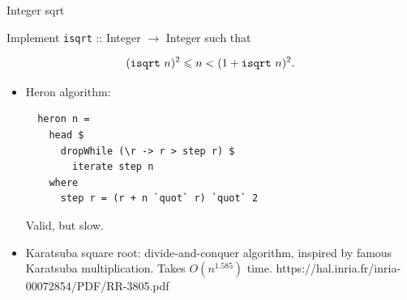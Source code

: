 \documentclass[handout]{beamer}
\def\le{\leqslant}
\def\isqrt#1{{\tt isqrt}~#1}
\begin{document}
\begin{frame}[fragile]{Integer sqrt}

Implement {\tt isqrt} :: Integer $\to$ Integer such that

$$(\isqrt n)^2 \le n < (1 + \isqrt n)^2.$$

\begin{itemize}

\item Heron algorithm:

  \begin{lstlisting}
  heron n =
    head $
      dropWhile (\r -> r > step r) $
        iterate step n
    where
      step r = (r + n `quot` r) `quot` 2
  \end{lstlisting}

  Valid, but slow.

\item Karatsuba square root: divide-and-conquer algorithm,
inspired by famous Karatsuba multiplication.
Takes $O(n^{1.585})$ time.
https://hal.inria.fr/inria-00072854/PDF/RR-3805.pdf

\end{itemize}

\end{frame}
\end{document}
